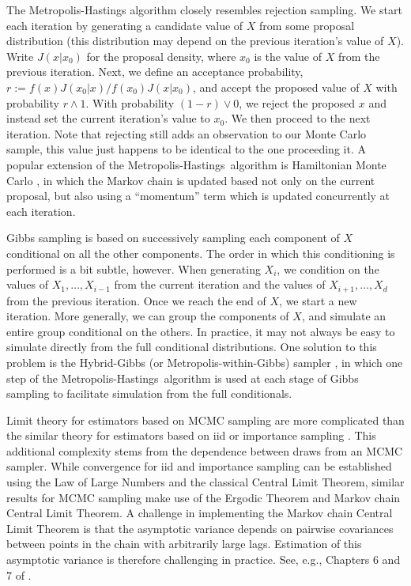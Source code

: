 \documentclass[11pt, oneside]{article}   	%
\newcommand{\mh}{Metropolis-Hastings}
\begin{document}
The Metropolis-Hastings algorithm closely resembles rejection sampling. We start each iteration by generating a candidate value of $X$ from some proposal distribution (this distribution may depend on the previous iteration's value of $X$). Write $J(x | x_0)$ for the proposal density, where $x_0$ is the value of $X$ from the previous iteration. Next, we define an acceptance probability, $r := f(x) J(x_0 | x) / f(x_0) J(x | x_0)$, and accept the proposed value of $X$ with probability $r \wedge 1$. With probability $(1-r) \vee 0$, we reject the proposed $x$ and instead set the current iteration's value to $x_0$. We then proceed to the next iteration. Note that rejecting still adds an observation to our Monte Carlo sample, this value just happens to be identical to the one proceeding it. A popular extension of the \mh\ algorithm is Hamiltonian Monte Carlo \citep[see Section 12.4 of][]{Gel13}, in which the Markov chain is updated based not only on the current proposal, but also using a ``momentum'' term which is updated concurrently at each iteration.

Gibbs sampling is based on successively sampling each component of $X$ conditional on all the other components. The order in which this conditioning is performed is a bit subtle, however. When generating $X_i$, we condition on the values of $X_1,\ldots, X_{i-1}$ from the current iteration and the values of $X_{i+1}, \ldots, X_d$ from the previous iteration. Once we reach the end of $X$, we start a new iteration.  More generally, we can group the components of $X$, and simulate an entire group conditional on the others. In practice, it may not always be easy to simulate directly from the full conditional distributions. One solution to this problem is the Hybrid-Gibbs (or Metropolis-within-Gibbs) sampler \citet[see Section 10.3.3 of][]{Rob04}, in which one step of the \mh\ algorithm is used at each stage of Gibbs sampling to facilitate simulation from the full conditionals.

Limit theory for estimators based on MCMC sampling are more complicated than the similar theory for estimators based on iid or importance sampling \citep{Gey91}. This additional complexity stems from the dependence between draws from an MCMC sampler. While convergence for iid and importance sampling can be established using the Law of Large Numbers and the classical Central Limit Theorem, similar results for MCMC sampling make use of the Ergodic Theorem and Markov chain Central Limit Theorem. A challenge in implementing the Markov chain Central Limit Theorem is that the asymptotic variance depends on pairwise covariances between points in the chain with arbitrarily large lags. Estimation of this asymptotic variance is therefore challenging in practice. See, e.g., Chapters 6 and 7 of \citet{Rob04}.
\end{document}

